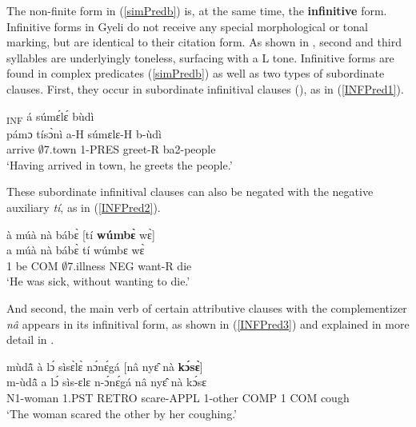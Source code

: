 
The non-finite form in (\ref{simPredb}) is, at the same time, the {\bfseries infinitive} form. Infinitive forms in Gyeli do not receive any special morphological or tonal marking, but are identical to their citation form. As shown in , second and third syllables are underlyingly toneless, surfacing with a L tone. Infinitive forms are found in complex predicates (\ref{simPredb}) as well as two types of subordinate clauses. First, they occur in subordinate infinitival clauses (), as in (\ref{INFPred1}).

\begin{exe}
\ex\label{INFPred1}
  \glll    [{\bfseries pámɔ̀} tísɔ̀nì]\textsubscript{INF} á súmɛ́lɛ́ bùdì \\
            pámɔ tísɔ̀nì a-H súmɛlɛ-H b-ùdì \\
             arrive $\emptyset$7.town 1-PRES greet-R ba2-people   \\
    \trans `Having arrived in town, he greets the people.'
\end{exe}

\noindent These subordinate infinitival clauses can also be negated with the negative auxiliary {\itshape tí}, as in (\ref{INFPred2}).

\begin{exe} 
\ex\label{INFPred2} 
  \glll  à múà nà bábɛ̀ [tí {\bfseries wúmbɛ̀} wɛ̀] \\
          a múà nà bábɛ̀ tí wúmbɛ wɛ̀   \\
         1 be COM $\emptyset$7.illness NEG want-R die \\
    \trans `He was sick, without wanting to die.'
\end{exe}


\noindent And second, the main verb of certain attributive clauses with the complementizer {\itshape nâ} appears in its infinitival form, as shown in (\ref{INFPred3}) and explained in more detail in . 

\begin{exe} 
\ex\label{INFPred3}
  \glll mùdã̂ à lɔ́ sìsɛ̀lɛ̀ nɔ́nɛ́gá [nâ nyɛ̂ nà {\bfseries kɔ́sɛ̀}] \\
m-ùdã̂ a lɔ́ sìs-ɛlɛ n-ɔ́nɛ́gá nâ nyɛ̂ nà kɔ́sɛ \\
N1-woman 1.PST RETRO scare-APPL 1-other COMP 1 COM cough     \\                        
  \trans `The woman scared the other by her coughing.'
\end{exe}


